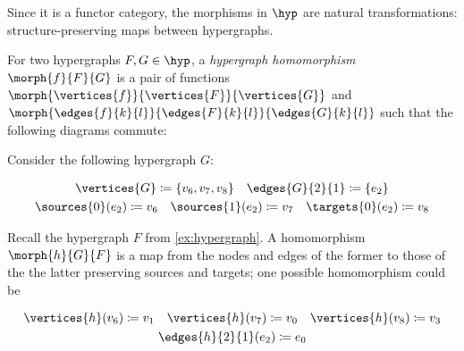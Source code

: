 Since it is a functor category, the morphisms in \(\hyp\) are natural
transformations: structure-preserving maps between hypergraphs.

\begin{definition}\label{def:hypergraph-homomorphism}
    For two hypergraphs \(F, G \in \hyp\), a \emph{hypergraph homomorphism}
    \(\morph{f}{F}{G}\) is a pair of functions
    \(\morph{\vertices{f}}{\vertices{F}}{\vertices{G}}\) and
    \(\morph{\edges{f}{k}{l}}{\edges{F}{k}{l}}{\edges{G}{k}{l}}\) such that the
    following diagrams commute:
    
\end{definition}
%
\begin{example}\label{ex:hypergraph-homomorphism}
    Consider the following hypergraph \(G\):
    \begin{center}
        \vspace{-\parskip}
        \begin{minipage}{0.75\textwidth}
            \begin{gather*}
                \vertices{G} \coloneqq \{v_6,v_7,v_8\}
                \quad
                \edges{G}{2}{1} \coloneqq \{e_2\}
                \\
                \sources{0}(e_2) \coloneqq v_6
                \quad
                \sources{1}(e_2) \coloneqq v_7
                \quad
                \targets{0}(e_2) \coloneqq v_8
            \end{gather*}
        \end{minipage}
        \begin{minipage}{0.2\textwidth}
            \centering

            \vspace{1.5em}

        \end{minipage}
    \end{center}

    Recall the hypergraph \(F\) from \cref{ex:hypergraph}.
    A homomorphism \(\morph{h}{G}{F}\) is a map from the nodes and edges
    of the former to those of the the latter preserving sources and targets;
    one possible homomorphism could be
    \begin{center}
        \begin{minipage}{0.75\textwidth}
            \begin{gather*}
                \vertices{h}(v_6) \coloneqq v_1
                \quad
                \vertices{h}(v_7) \coloneqq v_0
                \quad
                \vertices{h}(v_8) \coloneqq v_3
                \\
                \edges{h}{2}{1}(e_2) \coloneqq e_0
            \end{gather*}
        \end{minipage}
        \begin{minipage}{0.2\textwidth}
            \centering


\end{minipage}
\end{center}
\end{example}
